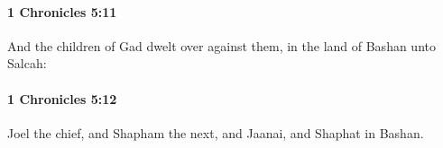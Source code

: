 		\paragraph{1 Chronicles 5:11} %
			\label{1CHRONICLES-5-11}

			And the children of Gad dwelt over against them, in the land of Bashan unto Salcah:


		\paragraph{1 Chronicles 5:12} %
			\label{1CHRONICLES-5-12}

			Joel the chief, and Shapham the next, and Jaanai, and Shaphat in Bashan.


